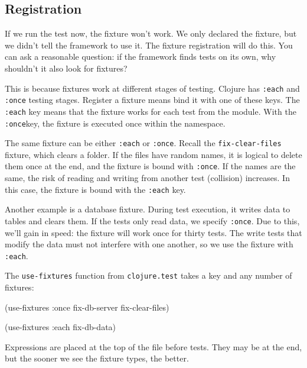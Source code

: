 \subsection{Registration}


If we run the test now, the fixture won't work. We only declared the fixture, but we didn't tell the framework to use it. The fixture registration will do this. You can ask a reasonable question: if the framework finds tests on its own, why shouldn't it also look for fixtures?

This is because fixtures work at different stages of testing. Clojure has \verb|:each| and \verb|:once| testing stages. Register a fixture means bind it with one of these keys. The \verb|:each| key means that the fixture works for each test from the module. With the \verb|:once|key, the fixture is executed once within the namespace.



The same fixture can be either \verb|:each| or \verb|:once|. Recall the \verb|fix-clear-files| fixture, which clears a folder. If the files have random names, it is logical to delete them once at the end, and the fixture is bound with \verb|:once|. If the names are the same, the risk of reading and writing from another test (collision) increases. In this case, the fixture is bound with the \verb|:each| key.

Another example is a database fixture. During test execution, it writes data to tables and clears them. If the tests only read data, we specify \verb|:once|. Due to this, we'll gain in speed: the fixture will work once for thirty tests. The write tests that modify the data must not interfere with one another, so we use the fixture with \verb|:each|.

The \verb|use-fixtures| function from \verb|clojure.test| takes a key and any number of fixtures:


\begin{english}
  \begin{clojure}
(use-fixtures :once
  fix-db-server fix-clear-files)

(use-fixtures :each fix-db-data)
  \end{clojure}
\end{english}

Expressions are placed at the top of the file before tests. They may be at the end, but the sooner we see the fixture types, the better.

